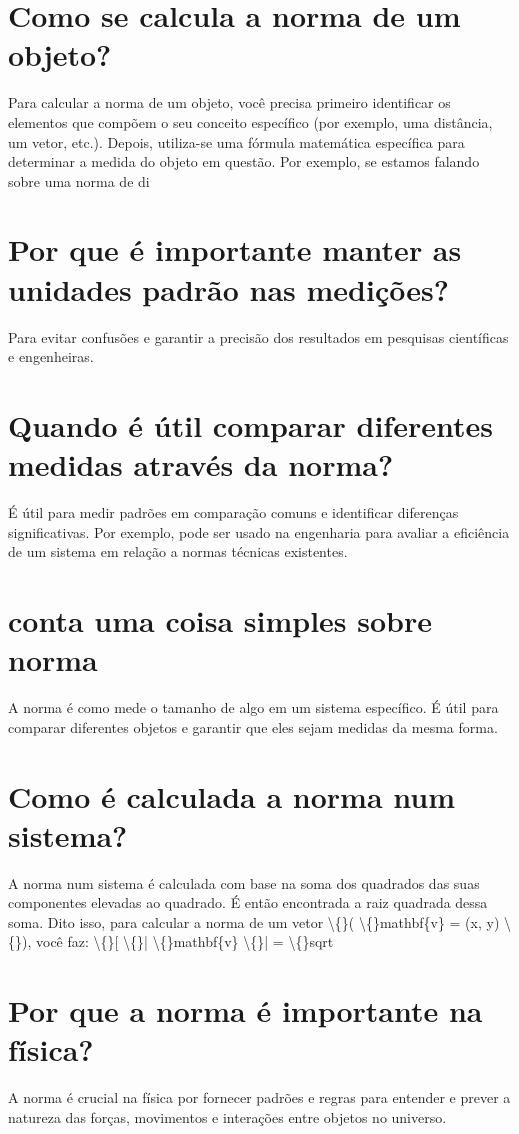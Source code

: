 \documentclass[11pt,a4paper]{article}
\begin{document}
\section{Como se calcula a norma de um objeto?}
Para calcular a norma de um objeto, você precisa primeiro identificar os elementos que compõem o seu conceito específico (por exemplo, uma distância, um vetor, etc.). Depois, utiliza-se uma fórmula matemática específica para determinar a medida do objeto em questão. Por exemplo, se estamos falando sobre uma norma de di

\section{Por que é importante manter as unidades padrão nas medições?}
Para evitar confusões e garantir a precisão dos resultados em pesquisas científicas e engenheiras.

\section{Quando é útil comparar diferentes medidas através da norma?}
É útil para medir padrões em comparação comuns e identificar diferenças significativas. Por exemplo, pode ser usado na engenharia para avaliar a eficiência de um sistema em relação a normas técnicas existentes.

\section{conta uma coisa simples sobre norma}
A norma é como mede o tamanho de algo em um sistema específico. É útil para comparar diferentes objetos e garantir que eles sejam medidas da mesma forma.

\section{Como é calculada a norma num sistema?}
A norma num sistema é calculada com base na soma dos quadrados das suas componentes elevadas ao quadrado. É então encontrada a raiz quadrada dessa soma. Dito isso, para calcular a norma de um vetor \textbackslash\{\}( \textbackslash\{\}mathbf\{v\} = (x, y) \textbackslash\{\}), você faz: \textbackslash\{\}[ \textbackslash\{\}| \textbackslash\{\}mathbf\{v\} \textbackslash\{\}| = \textbackslash\{\}sqrt

\section{Por que a norma é importante na física?}
A norma é crucial na física por fornecer padrões e regras para entender e prever a natureza das forças, movimentos e interações entre objetos no universo.
\end{document}
